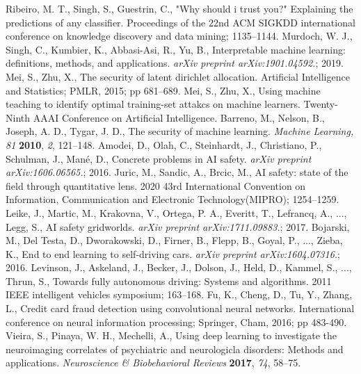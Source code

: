 \documentclass[journal,article,submit,moreauthors,pdftex]{Definitions/mdpi}
\begin{document}
\begin{thebibliography}{999}
Ribeiro, M. T., Singh, S., Guestrin, C., "Why should i trust you?" Explaining the predictions of any classifier. Proceedings of the 22nd ACM SIGKDD international conference on knowledge discovery and data mining; 1135--1144.
Murdoch, W. J., Singh, C., Kumbier, K., Abbasi-Asi, R., Yu, B., Interpretable machine learning: definitions, methods, and applications. \textit{arXiv preprint arXiv:1901.04592.}; 2019.
Mei, S., Zhu, X., The security of latent dirichlet allocation. Artificial Intelligence and Statistics; PMLR, 2015; pp 681--689.
Mei, S., Zhu, X., Using machine teaching to identify optimal training-set attakcs on machine learners. Twenty-Ninth AAAI Conference on Artificial Intelligence.
Barreno, M., Nelson, B., Joseph, A. D., Tygar, J. D.,  The security of machine learning. {\em Machine Learning, 81} {\bf 2010}, {\em 2}, 121--148.
Amodei, D., Olah, C., Steinhardt, J., Christiano, P., Schulman, J., Mané, D., Concrete problems in AI safety. \textit{arXiv preprint arXiv:1606.06565.}; 2016.
Juric, M., Sandic, A., Brcic, M., AI safety: state of the field through quantitative lens. 2020 43rd International Convention on Information, Communication and Electronic Technology(MIPRO); 1254--1259.
Leike, J., Martic, M., Krakovna, V., Ortega, P. A., Everitt, T., Lefrancq, A., ..., Legg, S., AI safety gridworlds. \textit{arXiv preprint arXiv:1711.09883.}; 2017.
Bojarski, M., Del Testa, D., Dworakowski, D., Firner, B., Flepp, B., Goyal, P., ..., Zieba, K., End to end learning to self-driving cars. \textit{arXiv preprint arXiv:1604.07316.}; 2016.
Levinson, J., Askeland, J., Becker, J., Dolson, J., Held, D., Kammel, S., ..., Thrun, S., Towards fully autonomous driving: Systems and algorithms. 2011 IEEE intelligent vehicles symposium; 163--168.
Fu, K., Cheng, D., Tu, Y., Zhang, L., Credit card fraud detection using convolutional neural networks. International conference on neural information processing; Springer, Cham, 2016; pp 483-490.
Vieira, S., Pinaya, W. H., Mechelli, A., Using deep learning to investigate the neuroimaging correlates of psychiatric and neurologicla disorders: Methods and applications. {\em Neuroscience \& Biobehavioral Reviews} {\bf 2017}, {\em 74}, 58--75.

\end{thebibliography}
\end{document}
